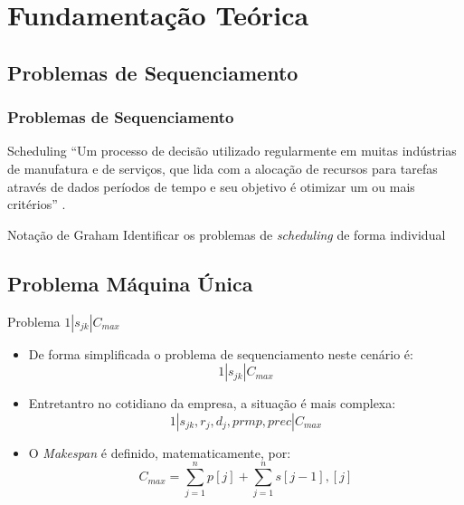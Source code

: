 \documentclass{beamer}
\begin{document}
\section{Fundamentação Teórica}
\begin{frame}
\tableofcontents[ 
    currentsubsection, 
    hideothersubsections, 
    sectionstyle=show/shaded
    ] 
\end{frame}
	\subsection{Problemas de Sequenciamento}
\begin{frame}
\frametitle{Problemas de Sequenciamento}
\begin{block}{Scheduling}
“Um processo de decisão utilizado regularmente em muitas indústrias de manufatura e de serviços, que lida com a alocação de recursos para tarefas através de dados períodos de tempo e seu objetivo é otimizar um ou mais critérios” \cite{pinedo2015scheduling}. 
\end{block}

\begin{block}{Notação de Graham}
Identificar os problemas de \textit{scheduling} de forma individual
\end{block}

\end{frame}    

\subsection{Problema Máquina Única}
\begin{frame}{Problema $1|s_{jk}|C_{max}$}
\begin{itemize}
\item De forma simplificada o problema de sequenciamento neste cenário é: 
\begin{equation}
1|s_{jk}|C_{max}
\end{equation}
\item Entretantro no cotidiano da empresa, a situação é mais complexa: 
\begin{equation}
1|s_{jk}, r_{j},d_{j},prmp,prec|C_{max}
\end{equation}



\item O \textit{Makespan} é definido, matematicamente, por: 
\begin{equation}
C_{max} = \sum_{j=1}^{n}p[j] + \sum_{j=1}^{n}s[j-1],[j]
\end{equation}

\end{itemize}
\end{frame}
\end{document}
